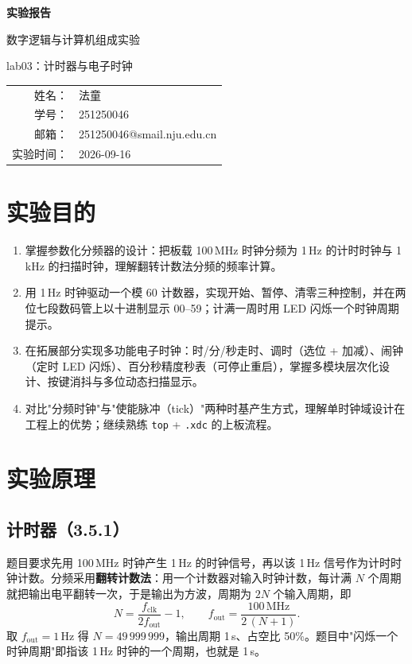 \documentclass[12pt, a4paper]{ctexart}
\makeatletter
\newcommand{\coursename}{数字逻辑与计算机组成实验}
\newcommand{\expname}{lab03：计时器与电子时钟}
\newcommand{\expdate}{2026-09-16}
\newcommand{\stuname}{法童}
\newcommand{\stuid}{251250046}
\newcommand{\stumail}{251250046@smail.nju.edu.cn}
\makeatother
\begin{document}
\begin{titlepage}
    \centering
    \vspace*{4cm}
    {\Huge\bfseries 实验报告\par}
    \vspace{1.5cm}
    {\Large \coursename\par}
    \vspace{0.8cm}
    {\Large \expname\par}
    \vspace{3cm}
    {\large
    \begin{tabular}{rl}
        姓名： & \stuname \\
        学号： & \stuid \\
        邮箱： & \stumail \\
        实验时间： & \expdate \\
    \end{tabular}\par}
\end{titlepage}

\section{实验目的}
\begin{enumerate}
    \item 掌握参数化分频器的设计：把板载 100\,MHz 时钟分频为 1\,Hz 的计时时钟与 1\,kHz 的扫描时钟，理解翻转计数法分频的频率计算。
    \item 用 1\,Hz 时钟驱动一个模 60 计数器，实现开始、暂停、清零三种控制，并在两位七段数码管上以十进制显示 00--59；计满一周时用 LED 闪烁一个时钟周期提示。
    \item 在拓展部分实现多功能电子时钟：时/分/秒走时、调时（选位 + 加减）、闹钟（定时 LED 闪烁）、百分秒精度秒表（可停止重启），掌握多模块层次化设计、按键消抖与多位动态扫描显示。
    \item 对比"分频时钟"与"使能脉冲（tick）"两种时基产生方式，理解单时钟域设计在工程上的优势；继续熟练 \texttt{top} + \texttt{.xdc} 的上板流程。
\end{enumerate}

\section{实验原理}

\subsection{计时器（3.5.1）}
题目要求先用 100\,MHz 时钟产生 1\,Hz 的时钟信号，再以该 1\,Hz 信号作为计时时钟计数。分频采用\textbf{翻转计数法}：用一个计数器对输入时钟计数，每计满 $N$ 个周期就把输出电平翻转一次，于是输出为方波，周期为 $2N$ 个输入周期，即
\begin{equation*}
    N = \frac{f_{\text{clk}}}{2 f_{\text{out}}} - 1,\qquad
    f_{\text{out}} = \frac{100\,\text{MHz}}{2\,(N+1)}.
\end{equation*}
取 $f_{\text{out}}=1$\,Hz 得 $N=49\,999\,999$，输出周期 1\,s、占空比 50\%。题目中"闪烁一个时钟周期"即指该 1\,Hz 时钟的一个周期，也就是 1\,s。
\end{document}
